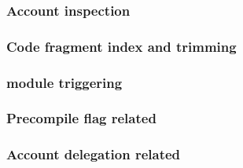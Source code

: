 \subsubsection{Account inspection                  }      \label{hub: account: specialized constraints: inspection}                    %
\subsubsection{Code fragment index and trimming    \lispDone{}}      \label{hub: account: specialized constraints: CFI and trim}                 
\subsubsection{\romLexMod{} module triggering      }      \label{hub: account: specialized constraints: rom lex triggering}            %
\subsubsection{Precompile flag related             \lispDone{}}      \label{hub: account: specialized constraints: precompile flag related}      
\subsubsection{Account delegation related          }      \label{hub: account: specialized constraints: account delegation related}    %
